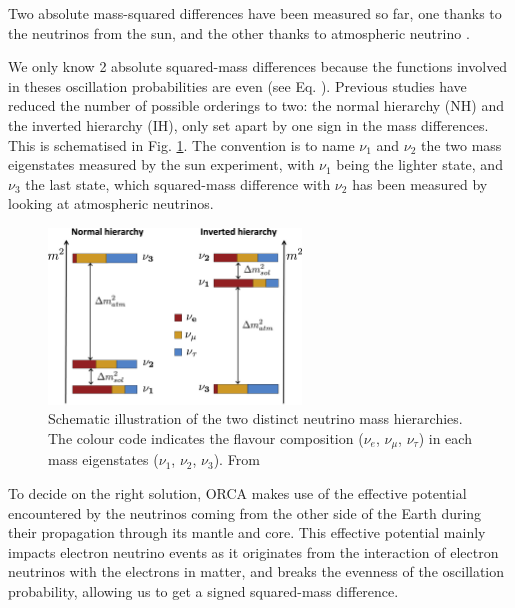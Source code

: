 Two absolute mass-squared differences have been measured so far, one thanks to the neutrinos from the sun, and the other thanks to atmospheric neutrino \citep{Patrignani:2016xqp}. 

We only know 2 absolute squared-mass differences because the functions involved in theses oscillation probabilities are even (see Eq. ). Previous studies have reduced the number of possible orderings to two: the normal hierarchy (NH) and the inverted hierarchy (IH), only set apart by one sign in the mass differences. This is schematised in Fig. \ref{fig:POAZFN}. The convention is to name $\nu_1$ and $\nu_2$ the two mass eigenstates measured by the sun experiment, with $\nu_1$ being the lighter state, and $\nu_3$ the last state, which squared-mass difference with $\nu_2$ has been measured by looking at atmospheric neutrinos.

\begin{figure}[h!]
    \centering
    \includegraphics[width=0.60\textwidth]{fig/Neutrino_mass_hierarchy_LoI.jpg}
    \caption{Schematic illustration of the two distinct neutrino mass hierarchies. The colour code indicates the flavour composition ($\nu_e$, $\nu_\mu$, $\nu_\tau$) in each mass eigenstates ($\nu_1$, $\nu_2$, $\nu_3$). From \citep{Hofestaedt2017}}
    \label{fig:POAZFN}
\end{figure}

To decide on the right solution, ORCA makes use of the effective potential encountered by the neutrinos coming from the other side of the Earth during their propagation through its mantle and core. This effective potential mainly impacts electron neutrino events as it originates from the interaction of electron neutrinos with the electrons in matter, and breaks the evenness of the oscillation probability, allowing us to get a signed squared-mass difference.

